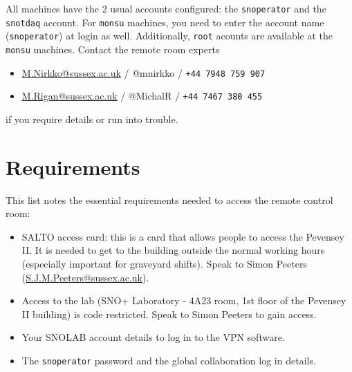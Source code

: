 \documentclass[12pt, oneside, a4paper]{article}
\begin{document}
All machines have the 2 usual accounts configured: the {\tt snoperator} and the {\tt snotdaq} account. For {\tt monsu} machines, you need to enter the account name ({\tt snoperator}) at login as well. Additionally, {\tt root} acounts are available at the {\tt monsu} machines. Contact the remote room experts
\begin{itemize}
\item \href{mailto:M.Nirkko@sussex.ac.uk}{M.Nirkko@sussex.ac.uk} / @mnirkko / {\tt +44 7948 759 907}
\item \href{mailto:M.Rigan@sussex.ac.uk}{M.Rigan@sussex.ac.uk} / @MichalR / {\tt +44 7467 380 455}
\end{itemize}
if you require details or run into trouble.

\section{Requirements}
This list notes the essential requirements needed to access the remote control room:
\begin{itemize}
	\item SALTO access card: this is a card that allows people to access the Pevensey II. It is needed to get to the building outside the normal working hours (especially important for graveyard shifts). Speak to Simon Peeters (\href{mailto:S.J.M.Peeters@sussex.ac.uk}{S.J.M.Peeters@sussex.ac.uk}).
	\item Access to the lab (SNO+ Laboratory - 4A23 room, 1st floor of the Pevensey II building) is code restricted.  Speak to Simon Peeters to gain access.
	\item Your SNOLAB account details to log in to the VPN software.
	\item The {\tt snoperator} password and the global collaboration log in details.
\end{itemize}
\end{document}
